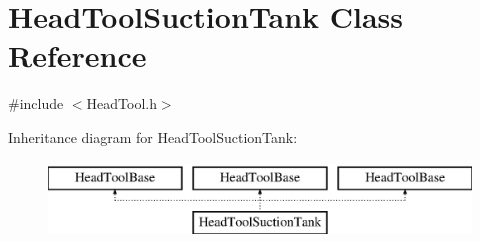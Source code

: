 \hypertarget{class_head_tool_suction_tank}{}\section{Head\+Tool\+Suction\+Tank Class Reference}
\label{class_head_tool_suction_tank}


{\ttfamily \#include $<$Head\+Tool.\+h$>$}

Inheritance diagram for Head\+Tool\+Suction\+Tank\+:\begin{figure}[H]
\begin{center}
\leavevmode
\includegraphics[height=2.000000cm]{d8/dec/class_head_tool_suction_tank}
\end{center}
\end{figure}

